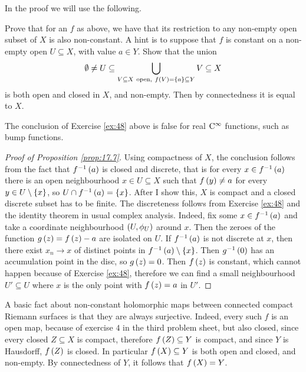 \pagebreak

In the proof we will use the following.

\begin{exercise**}
\label{ex:48}
Prove that for an $ f $ as above, we have that its restriction to any non-empty open subset of $ X $ is also non-constant. A hint is to suppose that $ f $ is constant on a non-empty open $ U \subseteq X $, with value $ a \in Y $. Show that the union
$$ \emptyset \ne U \subseteq \bigcup_{V \subseteq X \ \text{open}, \ f\br{V} = \cbr{a} \subseteq Y} V \subseteq X $$
is both open and closed in $ X $, and non-empty. Then by connectedness it is equal to $ X $.
\end{exercise**}

\begin{remark}
The conclusion of Exercise \ref{ex:48} above is false for real $ \mathrm{C}^\infty $ functions, such as bump functions.
\end{remark}

\begin{proof}[Proof of Proposition \ref{prop:17.7}]
Using compactness of $ X $, the conclusion follows from the fact that $ f^{-1}\br{a} $ is closed and discrete, that is for every $ x \in f^{-1}\br{a} $ there is an open neighbourhood $ x \in U \subseteq X $ such that $ f\br{y} \ne a $ for every $ y \in U \setminus \cbr{x} $, so $ U \cap f^{-1}\br{a} = \cbr{x} $. After I show this, $ X $ is compact and a closed discrete subset has to be finite. The discreteness follows from Exercise \ref{ex:48} and the identity theorem in usual complex analysis. Indeed, fix some $ x \in f^{-1}\br{a} $ and take a coordinate neighbourhood $ \br{U, \phi_U} $ around $ x $. Then the zeroes of the function $ g\br{z} = f\br{z} - a $ are isolated on $ U $. If $ f^{-1}\br{a} $ is not discrete at $ x $, then there exist $ x_n \to x $ of distinct points in $ f^{-1}\br{a} \setminus \cbr{x} $. Then $ g^{-1}\br{0} $ has an accumulation point in the disc, so $ g\br{z} = 0 $. Then $ f\br{z} $ is constant, which cannot happen because of Exercise \ref{ex:48}, therefore we can find a small neighbourhood $ U' \subseteq U $ where $ x $ is the only point with $ f\br{z} = a $ in $ U' $.
\end{proof}

\begin{remark}
A basic fact about non-constant holomorphic maps between connected compact Riemann surfaces is that they are always surjective. Indeed, every such $ f $ is an open map, because of exercise $ 4 $ in the third problem sheet, but also closed, since every closed $ Z \subseteq X $ is compact, therefore $ f\br{Z} \subseteq Y $ is compact, and since $ Y $ is Hausdorff, $ f\br{Z} $ is closed. In particular $ f\br{X} \subseteq Y $ is both open and closed, and non-empty. By connectedness of $ Y $, it follows that $ f\br{X} = Y $.
\end{remark}

